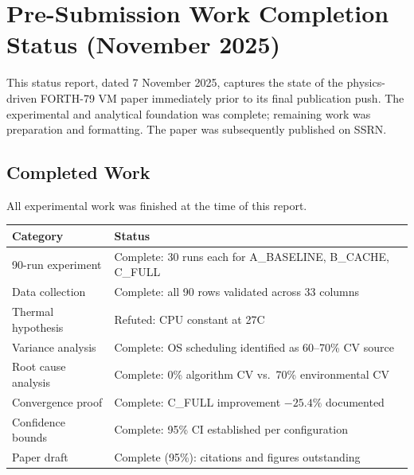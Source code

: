 
\section{Pre-Submission Work Completion Status (November 2025)}

This status report, dated 7 November 2025, captures the state of the
physics-driven FORTH-79 VM paper immediately prior to its final publication
push. The experimental and analytical foundation was complete; remaining
work was preparation and formatting. The paper was subsequently published
on SSRN.

\subsection{Completed Work}

All experimental work was finished at the time of this report.

\begin{center}
\begin{tabular}{lp{8cm}}
\toprule
Category & Status \\
\midrule
90-run experiment       & Complete: 30 runs each for A\_BASELINE, B\_CACHE, C\_FULL \\
Data collection         & Complete: all 90 rows validated across 33 columns \\
Thermal hypothesis      & Refuted: CPU constant at 27\textdegree{}C \\
Variance analysis       & Complete: OS scheduling identified as 60--70\% CV source \\
Root cause analysis     & Complete: 0\% algorithm CV vs.\ 70\% environmental CV \\
Convergence proof       & Complete: C\_FULL improvement $-25.4\%$ documented \\
Confidence bounds       & Complete: 95\% CI established per configuration \\
Paper draft             & Complete (95\%): citations and figures outstanding \\
\bottomrule
\end{tabular}
\end{center}

